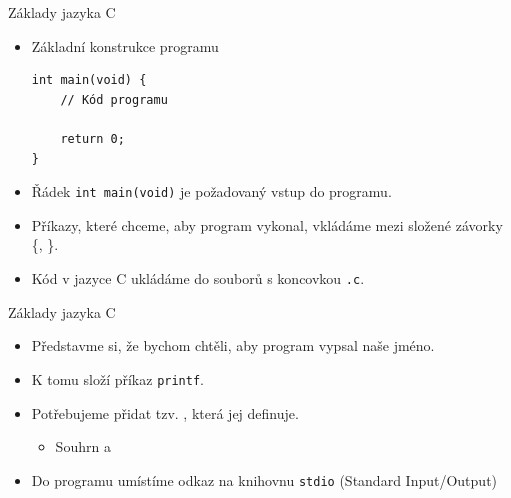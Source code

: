 \documentclass[14pt]{beamer}
\begin{document}
    \begin{frame}[t,fragile]{Základy jazyka C}
        \begin{itemize}
            \item Základní konstrukce programu
            \begin{lstlisting}
int main(void) {
    // Kód programu

    return 0;
}
            \end{lstlisting}
            \item Řádek \texttt{int main(void)} je požadovaný vstup do programu.
            \item Příkazy, které chceme, aby program vykonal, vkládáme mezi složené závorky \{, \}.
            \item Kód v jazyce C ukládáme do souborů s koncovkou \texttt{.c}.
        \end{itemize}
    \end{frame}

    \begin{frame}[t]{Základy jazyka C}
        \begin{itemize}
            \item Představme si, že bychom chtěli, aby program vypsal naše jméno.
            \item K tomu složí příkaz \texttt{printf}.
        \end{itemize}
        \begin{center}
             
        \end{center}
        \begin{itemize}
            \item Potřebujeme přidat tzv. , která jej definuje.
            \begin{itemize}
                \item Souhrn  a 
            \end{itemize}
        \end{itemize}
        \begin{center}
        \end{center}
        \begin{itemize}
            \item Do programu umístíme odkaz na knihovnu \texttt{stdio} (Standard Input/Output)
        \end{itemize}
    \end{frame}
\end{document}
